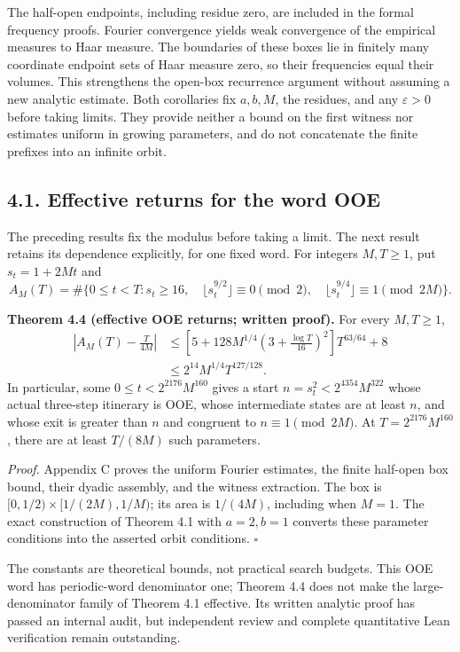 \documentclass[11pt,a4paper]{article}
\begin{document}
The half-open endpoints, including residue zero, are included in the
formal frequency proofs. Fourier convergence yields weak convergence of
the empirical measures to Haar measure. The boundaries of these boxes
lie in finitely many coordinate endpoint sets of Haar measure zero, so
their frequencies equal their volumes. This strengthens the open-box
recurrence argument without assuming a new analytic estimate. Both
corollaries fix \(a,b,M\), the residues, and any \(\varepsilon>0\)
before taking limits. They provide neither a bound on the first witness
nor estimates uniform in growing parameters, and do not concatenate the
finite prefixes into an infinite orbit.

\subsection{4.1. Effective returns for the word
OOE}\label{effective-returns-for-the-word-ooe}

The preceding results fix the modulus before taking a limit. The next
result retains its dependence explicitly, for one fixed word. For
integers \(M,T\ge1\), put \(s_t=1+2Mt\) and \[
A_M(T)=\#\{0\le t<T:s_t\ge16,\quad
 \lfloor s_t^{9/2}\rfloor\equiv0\pmod2,\quad
 \lfloor s_t^{9/4}\rfloor\equiv1\pmod{2M}\}.
\]

\textbf{Theorem 4.4 (effective OOE returns; written proof).} For every
\(M,T\ge1\), \[
\begin{split}
\left|A_M(T)-\frac{T}{4M}\right|
&\le\left[5+128M^{1/4}\left(3+\frac{\log T}{16}\right)^2\right]T^{63/64}+8\\
&\le2^{14}M^{1/4}T^{127/128}.
\end{split}
\tag{4.6}
\] In particular, some \(0\le t<2^{2176}M^{160}\) gives a start
\(n=s_t^2<2^{4354}M^{322}\) whose actual three-step itinerary is OOE,
whose intermediate states are at least \(n\), and whose exit is greater
than \(n\) and congruent to \(n\equiv1\pmod{2M}\). At
\(T=2^{2176}M^{160}\), there are at least \(T/(8M)\) such parameters.

\emph{Proof.} Appendix C proves the uniform Fourier estimates, the
finite half-open box bound, their dyadic assembly, and the witness
extraction. The box is \([0,1/2)\times[1/(2M),1/M)\); its area is
\(1/(4M)\), including when \(M=1\). The exact construction of Theorem
4.1 with \(a=2,b=1\) converts these parameter conditions into the
asserted orbit conditions. \(\square\)

The constants are theoretical bounds, not practical search budgets. This
OOE word has periodic-word denominator one; Theorem 4.4 does not make
the large-denominator family of Theorem 4.1 effective. Its written
analytic proof has passed an internal audit, but independent review and
complete quantitative Lean verification remain outstanding.
\end{document}
